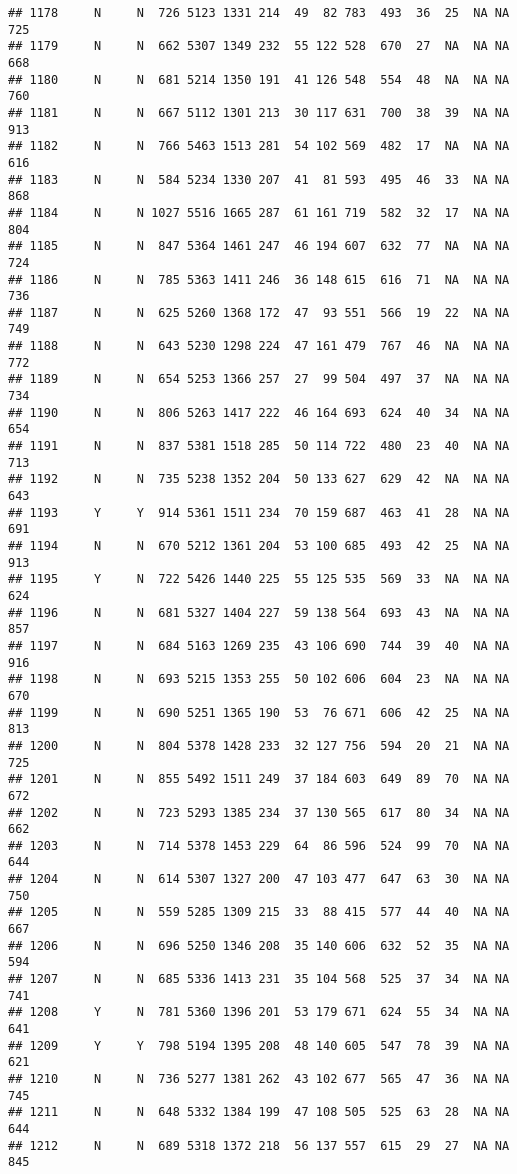 \documentclass[]{article}
\begin{document}
\begin{verbatim}
## 1178     N     N  726 5123 1331 214  49  82 783  493  36  25  NA NA  725
## 1179     N     N  662 5307 1349 232  55 122 528  670  27  NA  NA NA  668
## 1180     N     N  681 5214 1350 191  41 126 548  554  48  NA  NA NA  760
## 1181     N     N  667 5112 1301 213  30 117 631  700  38  39  NA NA  913
## 1182     N     N  766 5463 1513 281  54 102 569  482  17  NA  NA NA  616
## 1183     N     N  584 5234 1330 207  41  81 593  495  46  33  NA NA  868
## 1184     N     N 1027 5516 1665 287  61 161 719  582  32  17  NA NA  804
## 1185     N     N  847 5364 1461 247  46 194 607  632  77  NA  NA NA  724
## 1186     N     N  785 5363 1411 246  36 148 615  616  71  NA  NA NA  736
## 1187     N     N  625 5260 1368 172  47  93 551  566  19  22  NA NA  749
## 1188     N     N  643 5230 1298 224  47 161 479  767  46  NA  NA NA  772
## 1189     N     N  654 5253 1366 257  27  99 504  497  37  NA  NA NA  734
## 1190     N     N  806 5263 1417 222  46 164 693  624  40  34  NA NA  654
## 1191     N     N  837 5381 1518 285  50 114 722  480  23  40  NA NA  713
## 1192     N     N  735 5238 1352 204  50 133 627  629  42  NA  NA NA  643
## 1193     Y     Y  914 5361 1511 234  70 159 687  463  41  28  NA NA  691
## 1194     N     N  670 5212 1361 204  53 100 685  493  42  25  NA NA  913
## 1195     Y     N  722 5426 1440 225  55 125 535  569  33  NA  NA NA  624
## 1196     N     N  681 5327 1404 227  59 138 564  693  43  NA  NA NA  857
## 1197     N     N  684 5163 1269 235  43 106 690  744  39  40  NA NA  916
## 1198     N     N  693 5215 1353 255  50 102 606  604  23  NA  NA NA  670
## 1199     N     N  690 5251 1365 190  53  76 671  606  42  25  NA NA  813
## 1200     N     N  804 5378 1428 233  32 127 756  594  20  21  NA NA  725
## 1201     N     N  855 5492 1511 249  37 184 603  649  89  70  NA NA  672
## 1202     N     N  723 5293 1385 234  37 130 565  617  80  34  NA NA  662
## 1203     N     N  714 5378 1453 229  64  86 596  524  99  70  NA NA  644
## 1204     N     N  614 5307 1327 200  47 103 477  647  63  30  NA NA  750
## 1205     N     N  559 5285 1309 215  33  88 415  577  44  40  NA NA  667
## 1206     N     N  696 5250 1346 208  35 140 606  632  52  35  NA NA  594
## 1207     N     N  685 5336 1413 231  35 104 568  525  37  34  NA NA  741
## 1208     Y     N  781 5360 1396 201  53 179 671  624  55  34  NA NA  641
## 1209     Y     Y  798 5194 1395 208  48 140 605  547  78  39  NA NA  621
## 1210     N     N  736 5277 1381 262  43 102 677  565  47  36  NA NA  745
## 1211     N     N  648 5332 1384 199  47 108 505  525  63  28  NA NA  644
## 1212     N     N  689 5318 1372 218  56 137 557  615  29  27  NA NA  845

\end{verbatim}
\end{document}
